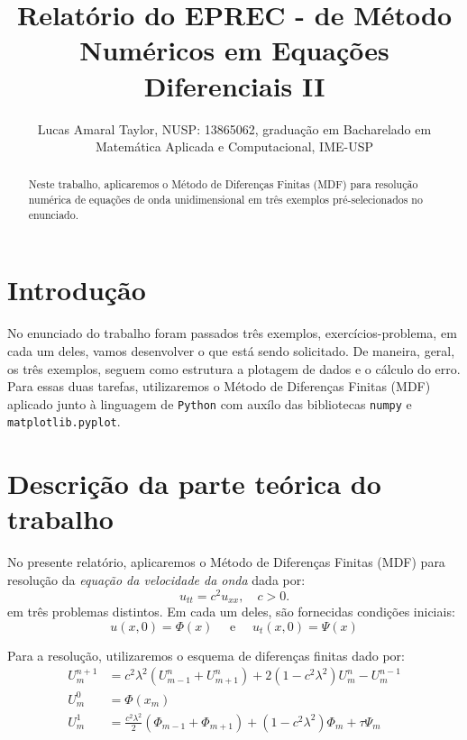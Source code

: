 \documentclass[column,amsmath,amssymb,floatfix]{revtex4}
\begin{document}
\title{Relatório do EPREC - de Método Numéricos em Equações Diferenciais II}

\author{Lucas Amaral Taylor, NUSP: 13865062, graduação em Bacharelado em Matemática Aplicada e Computacional,  IME-USP}

\begin{center}
	\begin{abstract}
		\baselineskip 11pt
		Neste trabalho, aplicaremos o Método de Diferenças Finitas (MDF) para resolução numérica de equações de onda unidimensional em três exemplos pré-selecionados no enunciado.
	\end{abstract}
\end{center}


\maketitle

\section{Introdução} 
No enunciado do trabalho foram passados três exemplos, exercícios-problema, em cada um deles, vamos desenvolver o que está sendo solicitado. De maneira, geral, os três exemplos, seguem como estrutura a plotagem de dados e o cálculo do erro. Para essas duas tarefas, utilizaremos o Método de Diferenças Finitas (MDF) aplicado junto à linguagem de \texttt{Python} com auxílo das bibliotecas \texttt{numpy} e \texttt{matplotlib.pyplot}.

\section{Descrição da parte teórica do trabalho}
No presente relatório, aplicaremos o Método de Diferenças Finitas (MDF) para resolução da \textit{equação da velocidade da onda} dada por:
\begin{equation}
	u_{tt} = c^2 u_{xx}, \quad c>0.
	\label{eq:equacao-da-onda}
\end{equation}
em três problemas distintos. Em cada um deles, são fornecidas condições iniciais:
\begin{equation}
	u(x,0) = \Phi(x) \quad \text{ e } \quad u_t(x, 0) = \Psi(x)
	\label{eq:condicao-inicial-onda}
\end{equation}

Para a resolução, utilizaremos o esquema de diferenças finitas dado por:
\begin{align}
	U_m^{n+1} & = c^2\lambda^2(U_{m-1}^n + U_{m+1}^n) + 2(1-c^2\lambda^2)U_m^n - U_m^{n-1} \label{eq:edf-principal}                  \\
	U_m^0     & = \Phi(x_m) \label{eq:edf-inicial}                                                                                   \\
	U_m^1     & = \frac{c^2\lambda^2}{2}(\Phi_{m-1} + \Phi_{m+1}) + (1-c^2\lambda^2)\Phi_m + \tau\Psi_m \label{eq:edf-passo-inicial} 
\end{align}
\end{document}

